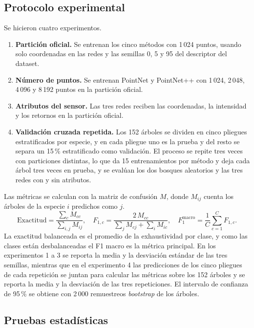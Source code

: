 \documentclass[preprint,12pt]{elsarticle}
\begin{document}
\subsection{Protocolo experimental}

Se hicieron cuatro experimentos.
\begin{enumerate}
\item \textbf{Partición oficial.} Se entrenan los cinco métodos con 1\,024 puntos, usando solo coordenadas en las redes y las semillas 0, 5 y 95 del descriptor del dataset.
\item \textbf{Número de puntos.} Se entrenan PointNet y PointNet++ con 1\,024, 2\,048, 4\,096 y 8\,192 puntos en la partición oficial.
\item \textbf{Atributos del sensor.} Las tres redes reciben las coordenadas, la intensidad y los retornos en la partición oficial.
\item \textbf{Validación cruzada repetida.} Los 152 árboles se dividen en cinco pliegues estratificados por especie, y en cada pliegue uno es la prueba y del resto se separa un 15\,\% estratificado como validación. El proceso se repite tres veces con particiones distintas, lo que da 15 entrenamientos por método y deja cada árbol tres veces en prueba, y se evalúan los dos bosques aleatorios y las tres redes con y sin atributos.
\end{enumerate}

Las métricas se calculan con la matriz de confusión $M$, donde $M_{ij}$ cuenta los árboles de la especie $i$ predichos como $j$.
\begin{equation}
\mathrm{Exactitud} = \frac{\sum_c M_{cc}}{\sum_{i,j} M_{ij}}, \quad F_{1,c} = \frac{2\,M_{cc}}{\sum_j M_{cj} + \sum_i M_{ic}}, \quad F_{1}^{\text{macro}} = \frac{1}{C}\sum_{c=1}^{C} F_{1,c}.
\label{eq:metrics}
\end{equation}
La exactitud balanceada es el promedio de la exhaustividad por clase, y como las clases están desbalanceadas el F1 macro es la métrica principal. En los experimentos 1 a 3 se reporta la media y la desviación estándar de las tres semillas, mientras que en el experimento 4 las predicciones de los cinco pliegues de cada repetición se juntan para calcular las métricas sobre los 152 árboles y se reporta la media y la desviación de las tres repeticiones. El intervalo de confianza de 95\,\% se obtiene con 2\,000 remuestreos \textit{bootstrap} de los árboles.

\subsection{Pruebas estadísticas}
\end{document}
